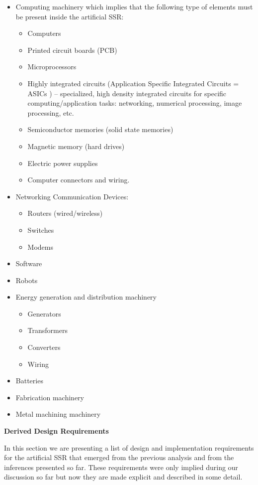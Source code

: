 \documentclass[letterpaper]{article}
\begin{document}
\bigskip

\begin{itemize}
\item Computing machinery which implies that the following type of
elements must be present inside the artificial SSR:

\begin{itemize}
\item Computers
\item Printed circuit boards (PCB)
\item Microprocessors
\item Highly integrated circuits (Application Specific Integrated
Circuits = ASICs ) – specialized, high density integrated circuits for
specific computing/application tasks: networking, numerical processing,
image processing, etc.
\item Semiconductor memories (solid state memories)
\item Magnetic memory (hard drives)
\item Electric power supplies
\item Computer connectors and wiring.
\end{itemize}
\item Networking Communication Devices:

\begin{itemize}
\item Routers (wired/wireless)
\item Switches
\item Modems
\end{itemize}
\item Software
\item Robots
\item Energy generation and distribution machinery

\begin{itemize}
\item Generators
\item Transformers
\item Converters
\item Wiring
\end{itemize}
\item Batteries
\item Fabrication machinery
\item Metal machining machinery
\end{itemize}
{\bfseries
\hypertarget{RefHeading3128306210128}{}Derived Design Requirements}

In this section we are presenting a list of design and implementation
requirements for the artificial SSR that emerged from the previous
analysis and from the inferences presented so far. These requirements
were only implied during our discussion so far but now they are made
explicit and described in some detail.
\end{document}
